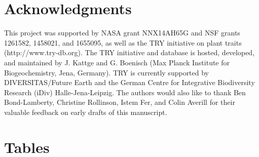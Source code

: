 \documentclass{article}
\begin{document}
\section{Acknowledgments}

This project was supported by NASA grant NNX14AH65G and NSF grants 1261582, 1458021, and 1655095, as well as the TRY initiative on plant traits (http://www.try-db.org).
The TRY initiative and database is hosted, developed, and maintained by J. Kattge and G. Boenisch (Max Planck Institute for Biogeochemistry, Jena, Germany).
TRY is currently supported by DIVERSITAS/Future Earth and the German Centre for Integrative Biodiversity Research (iDiv) Halle-Jena-Leipzig.
The authors would also like to thank Ben Bond-Lamberty, Christine Rollinson, Istem Fer, and Colin Averill for their valuable feedback on early drafts of this manuscript.



\section{Tables}

\pagebreak
\end{document}
